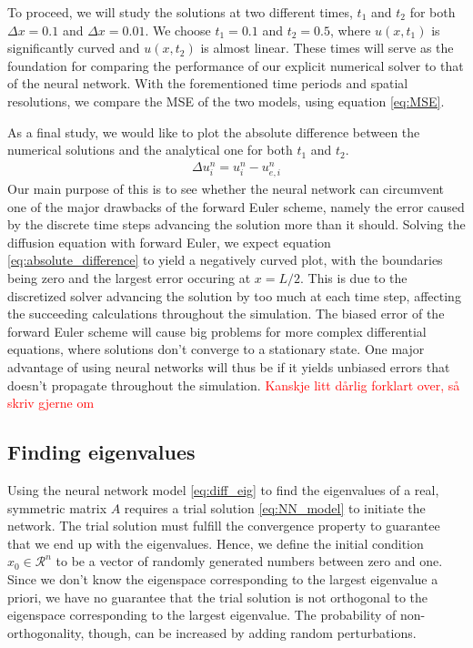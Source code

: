 \documentclass[12pt]{extarticle}
\begin{document}
To proceed, we will study the solutions at two different times, $t_1$ and $t_2$ for both $\Delta x = 0.1$ and $\Delta x = 0.01$. We choose $t_1=0.1$ and $t_2=0.5$, where $u(x,t_1)$ is significantly curved and $u(x,t_2)$ is almost linear. These times will serve as the foundation for comparing the performance of our explicit numerical solver to that of the neural network. With the forementioned time periods and spatial resolutions, we compare the MSE of the two models, using equation \eqref{eq:MSE}. 

As a final study, we would like to plot the absolute difference between the numerical solutions and the analytical one for both $t_1$ and $t_2$. 
\begin{align} \label{eq:absolute_difference}
	\Delta u_i^n = u_i^n - u_{e,i}^n
\end{align}
Our main purpose of this is to see whether the neural network can circumvent one of the major drawbacks of the forward Euler scheme, namely the error caused by the discrete time steps advancing the solution more than it should. Solving the diffusion equation with forward Euler, we expect equation \eqref{eq:absolute_difference} to yield a negatively curved plot, with the boundaries being zero and the largest error occuring at $x=L/2$. This is due to the discretized solver advancing the solution by too much at each time step, affecting the succeeding calculations throughout the simulation. The biased error of the forward Euler scheme will cause big problems for more complex differential equations, where solutions don't converge to a stationary state. One major advantage of using neural networks will thus be if it yields unbiased errors that doesn't propagate throughout the simulation. \textcolor{red}{Kanskje litt dårlig forklart over, så skriv gjerne om}



\subsection*{Finding eigenvalues}
Using the neural network model \eqref{eq:diff_eig} to find the eigenvalues of a real, symmetric matrix $A$ requires a trial solution \eqref{eq:NN_model} to initiate the network. The trial solution must fulfill the convergence property to guarantee that we end up with the eigenvalues. Hence, we define the initial condition $x_0 \in \mathcal{R}^n$ to be a vector of randomly generated numbers between zero and one. Since we don't know the eigenspace corresponding to the largest eigenvalue a priori, we have no guarantee that the trial solution is not orthogonal to the eigenspace corresponding to the largest eigenvalue. The probability of non-orthogonality, though, can be increased by adding random perturbations.
\end{document}

